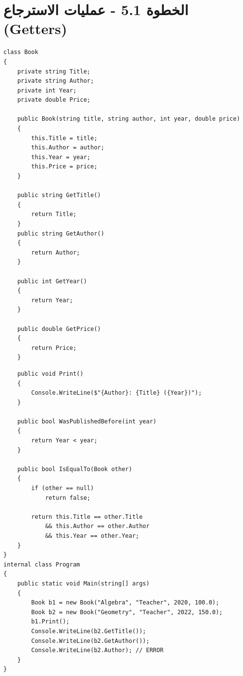 \documentclass[11pt]{article}
\begin{document}
\section*{الخطوة 5.1 - عمليات الاسترجاع (\textenglish{Getters})}
\begin{boxExample}
\begin{english}
\begin{verbatim}
class Book
{
    private string Title;
    private string Author;
    private int Year;
    private double Price;

    public Book(string title, string author, int year, double price)
    {
        this.Title = title;
        this.Author = author;
        this.Year = year;
        this.Price = price;
    }

    public string GetTitle()
    {
        return Title;
    }
    public string GetAuthor()
    {
        return Author;
    }

    public int GetYear()
    {
        return Year;
    }

    public double GetPrice()
    {
        return Price;
    }

\end{verbatim}
\end{english}
\end{boxExample}
\begin{boxExample}
\begin{english}
\begin{verbatim}
    public void Print()
    {
        Console.WriteLine($"{Author}: {Title} ({Year})");
    }

    public bool WasPublishedBefore(int year)
    {
        return Year < year;
    }

    public bool IsEqualTo(Book other)
    {
        if (other == null)
            return false;

        return this.Title == other.Title
            && this.Author == other.Author
            && this.Year == other.Year;
    }
}
internal class Program
{
    public static void Main(string[] args)
    {
        Book b1 = new Book("Algebra", "Teacher", 2020, 100.0);
        Book b2 = new Book("Geometry", "Teacher", 2022, 150.0);
        b1.Print();
        Console.WriteLine(b2.GetTitle());
        Console.WriteLine(b2.GetAuthor());
        Console.WriteLine(b2.Author); // ERROR
    }
}
\end{verbatim}
\end{english}
\end{boxExample}
\end{document}
